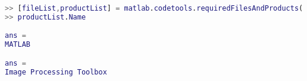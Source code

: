 \begin{lstlisting}[language=Matlab]
>> [fileList,productList] = matlab.codetools.requiredFilesAndProducts('graythresh');
>> productList.Name

ans =
MATLAB

ans =
Image Processing Toolbox

\end{lstlisting}